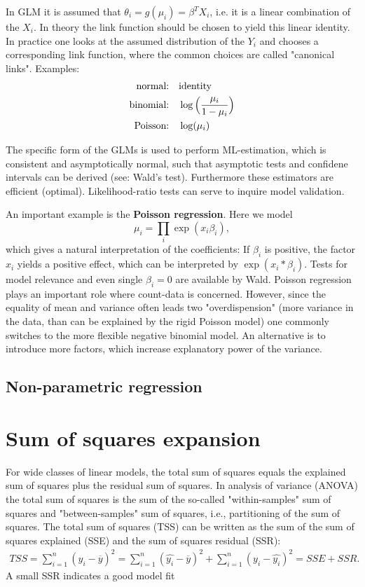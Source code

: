 \documentclass[12pt,a4paper]{amsart}
\theoremstyle{definition}
\theoremstyle{remark}
\numberwithin{equation}{section}
\begin{document}
In GLM it is assumed that $\theta_i =g(\mu_i)= \beta^T X_i$, i.e. it is a linear combination of the $X_i$. In theory the link function should be chosen to yield this linear identity. In practice one looks at the assumed distribution of the $Y_i$ and chooses a corresponding link function, where the common choices are called "canonical links". Examples: 
\begin{align*} 
\textnormal{normal:} & \quad \textnormal{identity} \\
\textnormal{binomial:} & \quad \log\Big( \frac{\mu_i}{1-\mu_i}\Big) \\
\textnormal{Poisson:} & \quad \log(\mu_i)
\end{align*}

 The specific form of the GLMs is used to perform ML-estimation, which is consistent and asymptotically normal, such that asymptotic tests and confidene intervals can be derived (see: Wald's test). Furthermore these estimators are efficient (optimal). Likelihood-ratio tests can serve to inquire model validation. 
 
 
 An important example is the \textbf{Poisson regression}. Here we model 
 $$ \mu_i= \prod_i \exp(x_i \beta_i),$$
which gives a natural interpretation of the coefficients: If $\beta_i$ is positive, the factor $x_i$ yields a positive effect, which can be interpreted by $\exp(x_i*\beta_i)$. Tests for model relevance and even single $\beta_i =0$ are available by Wald. Poisson regression plays an important role where count-data is concerned. However, since the equality of mean and variance often leads two "overdispension" (more variance in the data, than can be explained by the rigid Poisson model) one commonly switches to the more flexible negative binomial model. An alternative is to introduce more factors, which increase explanatory power of the variance. 



\subsection{Non-parametric regression} %

\section{Sum of squares expansion}
For wide classes of linear models, the total sum of squares equals the explained sum of squares plus the residual sum of squares. In analysis of variance (ANOVA) the total sum of squares is the sum of the so-called "within-samples" sum of squares and "between-samples" sum of squares, i.e., partitioning of the sum of squares.
The total sum of squares (TSS) can be written as the sum of the sum of squares explained (SSE) and the sum of squares residual (SSR):
\begin{align*}
TSS= \sum_{i=1}^n \left(y_i-\overline{y}\right)^2 = \sum_{i=1}^n \left(\hat{y_i}-\overline{y}\right)^2+\sum_{i=1}^n \left(y_i-\hat{y_i}\right)^2=SSE+SSR.
\end{align*}
A small SSR indicates a good model fit %
\end{document}
